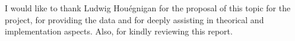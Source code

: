 I would like to thank Ludwig Houégnigan for the proposal of this topic for the project, for providing the data and for deeply assisting in theorical and implementation aspects. Also, for kindly reviewing this report.
